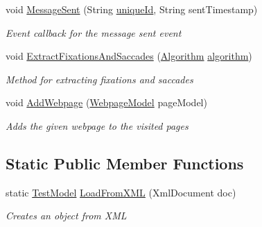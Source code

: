 \begin{DoxyCompactItemize}
void \hyperlink{class_web_analyzer_1_1_models_1_1_data_model_1_1_test_model_af5443d18d5c7d80edaf417ee28bb296e}{Message\+Sent} (String \hyperlink{_u_i_2_h_t_m_l_resources_2js_2lib_2underscore_8min_8js_af690ff5521d79c7128861033ae80ae17}{unique\+Id}, String sent\+Timestamp)
\begin{DoxyCompactList}\small\item\em Event callback for the message sent event \end{DoxyCompactList}\item 
void \hyperlink{class_web_analyzer_1_1_models_1_1_data_model_1_1_test_model_aca2998a693a880f8c1fd1457615988ac}{Extract\+Fixations\+And\+Saccades} (\hyperlink{class_web_analyzer_1_1_models_1_1_algorithm_model_1_1_algorithm}{Algorithm} \hyperlink{_u_i_2_h_t_m_l_resources_2js_2src_2analyse_8js_a1222cf9678e9ad6a699b071d3308f976}{algorithm})
\begin{DoxyCompactList}\small\item\em Method for extracting fixations and saccades \end{DoxyCompactList}\item 
void \hyperlink{class_web_analyzer_1_1_models_1_1_data_model_1_1_test_model_a1bcf5235fe6f1f1b24ff74325742021e}{Add\+Webpage} (\hyperlink{class_web_analyzer_1_1_models_1_1_data_model_1_1_webpage_model}{Webpage\+Model} page\+Model)
\begin{DoxyCompactList}\small\item\em Adds the given webpage to the visited pages \end{DoxyCompactList}\end{DoxyCompactItemize}
\subsection*{Static Public Member Functions}
\begin{DoxyCompactItemize}
\item 
static \hyperlink{class_web_analyzer_1_1_models_1_1_data_model_1_1_test_model}{Test\+Model} \hyperlink{class_web_analyzer_1_1_models_1_1_data_model_1_1_test_model_a0bf31831033b33d1e50ddd856c6a61aa}{Load\+From\+X\+M\+L} (Xml\+Document doc)
\begin{DoxyCompactList}\small\item\em Creates an object from X\+M\+L \end{DoxyCompactList}\end{DoxyCompactItemize}
